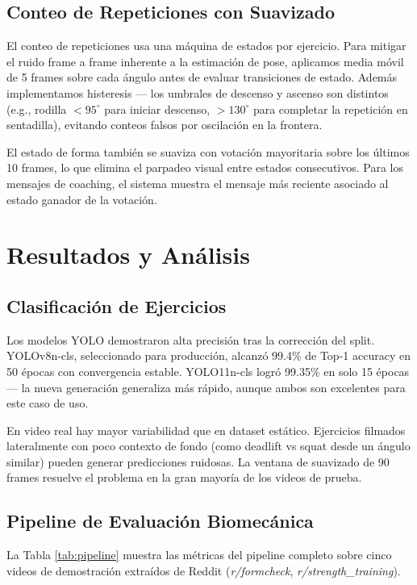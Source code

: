 \documentclass[conference]{IEEEtran}
\begin{document}
\subsection{Conteo de Repeticiones con Suavizado}

El conteo de repeticiones usa una máquina de estados por ejercicio. Para mitigar el ruido frame a frame inherente a la estimación de pose, aplicamos media móvil de 5 frames sobre cada ángulo antes de evaluar transiciones de estado. Además implementamos histeresis — los umbrales de descenso y ascenso son distintos (e.g., rodilla $< 95^\circ$ para iniciar descenso, $> 130^\circ$ para completar la repetición en sentadilla), evitando conteos falsos por oscilación en la frontera.

El estado de forma también se suaviza con votación mayoritaria sobre los últimos 10 frames, lo que elimina el parpadeo visual entre estados consecutivos. Para los mensajes de coaching, el sistema muestra el mensaje más reciente asociado al estado ganador de la votación.

\section{Resultados y Análisis}

\subsection{Clasificación de Ejercicios}

Los modelos YOLO demostraron alta precisión tras la corrección del split. YOLOv8n-cls, seleccionado para producción, alcanzó 99.4\% de Top-1 accuracy en 50 épocas con convergencia estable. YOLO11n-cls logró 99.35\% en solo 15 épocas — la nueva generación generaliza más rápido, aunque ambos son excelentes para este caso de uso.

En video real hay mayor variabilidad que en dataset estático. Ejercicios filmados lateralmente con poco contexto de fondo (como deadlift vs squat desde un ángulo similar) pueden generar predicciones ruidosas. La ventana de suavizado de 90 frames resuelve el problema en la gran mayoría de los videos de prueba.

\subsection{Pipeline de Evaluación Biomecánica}

La Tabla \ref{tab:pipeline} muestra las métricas del pipeline completo sobre cinco videos de demostración extraídos de Reddit (\textit{r/formcheck}, \textit{r/strength\_training}).
\end{document}
